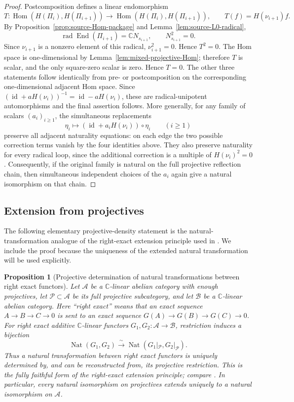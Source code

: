 \documentclass[12pt,leqno]{amsart}
\numberwithin{equation}{section}
\newtheorem{prop}[thm]{Proposition}
\newcommand{\End}{\operatorname{End}}
\newcommand{\Hom}{\operatorname{Hom}}
\newcommand{\rad}{\operatorname{rad}}
\newcommand{\id}{\operatorname{id}}
\def\C{\mathbb{C}}
\begin{document}
\begin{proof}
Postcomposition defines a linear endomorphism
\[
 T:\Hom(H(\Pi_i),H(\Pi_{i+1}))\longrightarrow
   \Hom(H(\Pi_i),H(\Pi_{i+1})),
 \qquad T(f)=H(\nu_{i+1})f.
\]
By Proposition~\ref{prop:source-Hom-package} and
Lemma~\ref{lem:source-L0-radical},
\[
 \rad\End(\Pi_{i+1})=\C N_{s_{i+1}},
 \qquad N_{s_{i+1}}^2=0.
\]
Since $\nu_{i+1}$ is a nonzero element of this radical,
$\nu_{i+1}^2=0$.  Hence $T^2=0$.  The Hom space is one-dimensional by Lemma~\ref{lem:mixed-projective-Hom};
therefore $T$ is scalar, and the only square-zero scalar is zero.  Hence
$T=0$.  The other three
statements follow identically from pre- or postcomposition on the
corresponding one-dimensional adjacent Hom space.  Since
$(\id+aH(\nu_i))^{-1}=\id-aH(\nu_i)$, these are radical-unipotent
automorphisms and the final assertion follows.  More generally, for any
family of scalars $(a_i)_{i\ge1}$, the simultaneous replacements
\[
 \eta_i\longmapsto(\id+a_iH(\nu_i))\circ\eta_i
 \qquad(i\ge1)
\]
preserve all adjacent naturality equations: on each edge the two possible
correction terms vanish by the four identities above.  They also preserve
naturality for every radical loop, since the additional correction is a
multiple of $H(\nu_i)^2=0$.  Consequently, if the original family is natural on the full projective
reflection chain, then simultaneous independent choices of the $a_i$
again give a natural isomorphism on that chain.
\end{proof}

\subsection{Extension from projectives}

The following elementary projective-density statement is the
natural-transformation analogue of the right-exact extension principle
used in \cite[Theorem~6.7]{McRaeYang}.  We include the proof because the
uniqueness of the extended natural transformation will be used explicitly.

\begin{prop}[Projective determination of natural transformations between right exact functors]
\label{prop:right-exact-extension}
Let $\mathcal A$ be a $\C$-linear abelian category with enough projectives,
let $\mathcal P\subset\mathcal A$ be its full projective subcategory, and
let $\mathcal B$ be a $\C$-linear abelian category.  Here ``right exact''
means that an exact sequence $A\to B\to C\to0$ is sent to an exact sequence
$G(A)\to G(B)\to G(C)\to0$.  For right exact additive $\C$-linear functors $G_1,G_2:\mathcal A\to\mathcal B$, restriction
induces a bijection
\[
 \operatorname{Nat}(G_1,G_2)
 \xrightarrow{\ \sim\ }
 \operatorname{Nat}(G_1|_{\mathcal P},G_2|_{\mathcal P}).
\]
Thus a natural transformation between right exact functors is uniquely
determined by, and can be reconstructed from, its projective restriction.
This is the fully faithful form of the right-exact extension principle;
compare \cite[Theorem~6.7]{McRaeYang}.  In particular, every natural
isomorphism on projectives extends uniquely
to a natural isomorphism on $\mathcal A$.
\end{prop}
\end{document}
